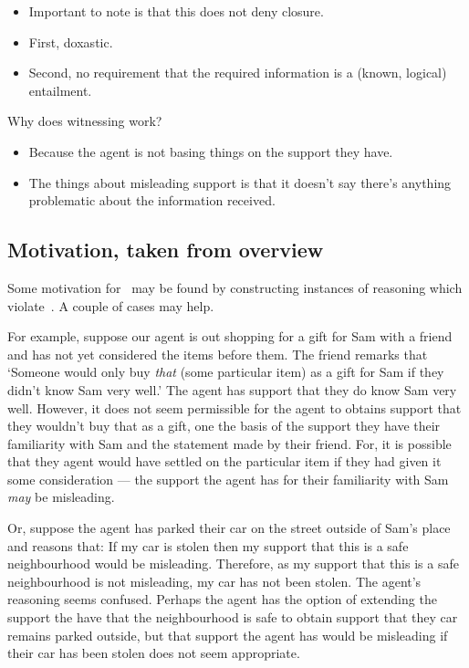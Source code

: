 \begin{itemize}
\item Important to note is that this does not deny closure.
\item First, doxastic.
\item Second, no requirement that the required information is a (known, logical) entailment.
\end{itemize}

Why does witnessing work?

\begin{itemize}
\item Because the agent is not basing things on the support they have.
\item The things about misleading support is that it doesn't say there's anything problematic about the information received.
\end{itemize}

\subsection{Motivation, taken from overview}
\label{sec:motiv-taken-from}

\begin{note}
  Some motivation for~\nI{} may be found by constructing instances of reasoning which violate~\nI{}.
  A couple of cases may help.

  For example, suppose our agent is out shopping for a gift for Sam with a friend and has not yet considered the items before them.
  The friend remarks that `Someone would only buy \emph{that} (some particular item) as a gift for Sam if they didn't know Sam very well.'
  The agent has support that they do know Sam very well.
  However, it does not seem permissible for the agent to obtains support that they wouldn't buy that as a gift, one the basis of the support they have their familiarity with Sam and the statement made by their friend.
  For, it is possible that they agent would have settled on the particular item if they had given it some consideration --- the support the agent has for their familiarity with Sam \emph{may} be misleading.

  Or, suppose the agent has parked their car on the street outside of Sam's place and reasons that:
  If my car is stolen then my support that this is a safe neighbourhood would be misleading.
  Therefore, as my support that this is a safe neighbourhood is not misleading, my car has not been stolen.
  The agent's reasoning seems confused.
  Perhaps the agent has the option of extending the support the have that the neighbourhood is safe to obtain support that they car remains parked outside, but that support the agent has would be misleading if their car has been stolen does not seem appropriate.
\end{note}

